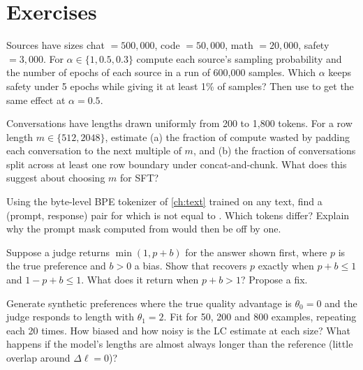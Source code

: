 \section{Exercises}\label{sec:align:exercises}

\begin{exercise}
Sources have sizes chat $=500{,}000$, code $=50{,}000$, math $=20{,}000$, safety $=3{,}000$. For
$\alpha\in\{1, 0.5, 0.3\}$ compute each source's sampling probability and the number of epochs of
each source in a run of 600{,}000 samples. Which $\alpha$ keeps safety under 5 epochs while giving it
at least 1\% of samples? Then use  to get the same effect at
$\alpha=0.5$.
\end{exercise}

\begin{exercise}
Conversations have lengths drawn uniformly from 200 to 1{,}800 tokens. For a row length
$m\in\{512, 2048\}$, estimate (a) the fraction of compute wasted by padding each conversation to the
next multiple of $m$, and (b) the fraction of conversations split across at least one row boundary
under concat-and-chunk. What does this suggest about choosing $m$ for SFT?
\end{exercise}

\begin{exercise}
Using the byte-level BPE tokenizer of \cref{ch:text} trained on any text, find a (prompt, response)
pair for which  is not equal to
. Which tokens differ? Explain why the prompt mask computed
from  would then be off by one.
\end{exercise}

\begin{exercise}
Suppose a judge returns $\min(1, p + b)$ for the answer shown first, where $p$ is the true preference
and $b>0$ a bias. Show that  recovers $p$ exactly when $p+b\le1$ and
$1-p+b\le1$. What does it return when $p+b>1$? Propose a fix.
\end{exercise}

\begin{exercise}
Generate synthetic preferences where the true quality advantage is $\theta_0=0$ and the judge
responds to length with $\theta_1=2$. Fit  for 50, 200 and
800 examples, repeating each 20 times. How biased and how noisy is the LC estimate at each size? What happens if
the model's lengths are almost always longer than the reference (little overlap around $\Delta\ell=0$)?
\end{exercise}

